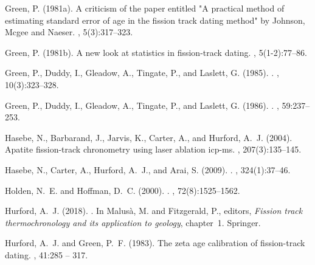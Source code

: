 \documentclass{article}
\begin{document}
\begin{thebibliography}{}
Green, P. (1981a).
\newblock A criticism of the paper entitled "{A} practical method of estimating
  standard error of age in the fission track dating method" by {J}ohnson,
  {M}cgee and {N}aeser.
, 5(3):317--323.

Green, P. (1981b).
\newblock A new look at statistics in fission-track dating.
, 5(1-2):77--86.

Green, P., Duddy, I., Gleadow, A., Tingate, P., and Laslett, G. (1985).
.
,
  10(3):323--328.

Green, P., Duddy, I., Gleadow, A., Tingate, P., and Laslett, G. (1986).
.
, 59:237--253.

Hasebe, N., Barbarand, J., Jarvis, K., Carter, A., and Hurford, A.~J. (2004).
\newblock Apatite fission-track chronometry using laser ablation icp-ms.
, 207(3):135--145.

Hasebe, N., Carter, A., Hurford, A.~J., and Arai, S. (2009).
.
,
  324(1):37--46.

Holden, N.~E. and Hoffman, D.~C. (2000).
.
, 72(8):1525--1562.

Hurford, A.~J. (2018).
.
\newblock In Malus\`{a}, M. and Fitzgerald, P., editors, {\em Fission track
  thermochronology and its application to geology}, chapter~1. Springer.

Hurford, A.~J. and Green, P.~F. (1983).
\newblock The zeta age calibration of fission-track dating.
, 41:285 -- 317.


\end{thebibliography}
\end{document}
